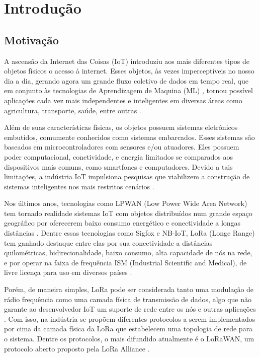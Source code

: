 \chapter{Introdução}

\section{Motivação}

A ascensão da Internet das Coisas (IoT) introduziu aos mais diferentes tipos de objetos
físicos o acesso à internet. Esses objetos, às vezes imperceptíveis no nosso dia a dia,
gerando agora um grande fluxo coletivo de dados em tempo real, que em conjunto às 
tecnologias de Aprendizagem de Maquina (ML) \cite{8001570}, tornou possível aplicações
cada vez mais independentes e inteligentes em diversas áreas como agricultura,
transporte, saúde, entre outras \cite{8883163}\cite{8358540}\cite{7474197}.

Além de suas características físicas, os objetos possuem sistemas eletrônicos embutidos, 
comumente conhecidos como sistemas embarcados. Esses sistemas são baseados em 
microcontroladores com sensores e/ou atuadores. Eles possuem poder computacional, 
conetividade, e energia limitados se
comparados aos dispositivos mais comuns, como smartfones e computadores. Devido a tais 
limitações, a indústria IoT impulsiona pesquisas que viabilizem a construção 
de sistemas inteligentes nos mais restritos cenários \cite{9221219}.

Nos últimos anos, tecnologias como LPWAN (Low Power Wide Area Network) tem tornado
realidade sistemas IoT com objetos 
distribuídos num grande espaço geográfico por oferecerem baixo consumo energético e 
conectividade a longas distâncias \cite{7815384}. Dentre essas tecnologias como
Sigfox e NB-IoT, LoRa (Longe Range) tem ganhado destaque entre elas por sua conectividade 
a distâncias quilométricas, bidirecionalidade, baixo consumo, alta capacidade de nós na 
rede, e por operar na faixa de frequência ISM (Industrial Scientific and Medical),
de livre licença para uso em diversos países \cite{9230597}.

Porém, de maneira simples, LoRa pode ser considerada tanto uma modulação de rádio 
frequência como uma camada física de transmissão de dados, algo que não garante ao 
desenvolvedor IoT um suporte de rede entre os nós e outras aplicações \cite{8474715}.
Com isso, na indústria se propõem diferentes protocolos a serem implementados por cima
da camada física da LoRa que estabelecem uma topologia de rede para o sistema.
Dentre os protocolos, o mais difundido atualmente é o LoRaWAN, um protocolo aberto 
proposto pela LoRa Alliance \cite{8767242}.

